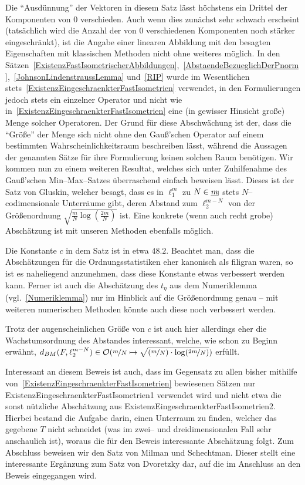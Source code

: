 \documentclass[a4paper]{report}
\numberwithin[\roman]{equation}{sat}
\begin{document}

\parag
Die \enquote{Ausdünnung} der Vektoren in diesem Satz lässt höchstens ein Drittel der
Komponenten von $0$ verschieden.
Auch wenn dies zunächst sehr schwach erscheint
(tatsächlich wird die Anzahl der von $0$ verschiedenen Komponenten noch stärker
eingeschränkt), ist die Angabe einer linearen Abbildung mit den besagten
Eigenschaften mit klassischen Methoden nicht ohne weiteres möglich.\parag
In den Sätzen~\ref{ExistenzFastIsometrischerAbbildungen},~\ref{AbstaendeBezueglichDerPnorm},~\ref{JohnsonLindenstraussLemma} und~\ref{RIP} wurde im Wesentlichen stets~\ref{ExistenzEingeschraenkterFastIsometrien} verwendet, in den Formulierungen
jedoch stets ein einzelner Operator und nicht wie in~\ref{ExistenzEingeschraenkterFastIsometrien} eine (in gewisser Hinsicht große)
Menge solcher Operatoren.
Der Grund für diese Abschwächung ist der, dass die \enquote{Größe} der Menge sich nicht ohne den Gauß'schen Operator auf
einem bestimmten Wahrscheinlichkeitsraum beschreiben lässt, während die
Aussagen der genannten Sätze für ihre Formulierung keinen solchen Raum
benötigen.\parag
Wir kommen nun zu einem weiteren Resultat, welches sich unter Zuhilfenahme des
Gauß'schen Min--Max--Satzes überraschend einfach beweisen lässt.
Dieses ist der Satz von Gluskin, welcher besagt, dass es in $\ell_1^m$ zu $N \in \haken m$
stets $N$--codimensionale Unterräume gibt, deren Abstand zum $\ell_2^{m-N}$ von
der Größenordnung $\sqrt{\frac m N \log\left(\frac{2m}N\right)}$ ist.
Eine konkrete (wenn auch recht grobe) Abschätzung ist mit unseren Methoden ebenfalls möglich.



Die Konstante $c$ in dem Satz ist in etwa $48.2$.
Beachtet man, dass die Abschätzungen für die Ordnungsstatistiken eher kanonisch als filigran waren,
so ist es naheliegend anzunehmen, dass diese Konstante etwas verbessert werden kann.
Ferner ist auch die Abschätzung des $t_\eta$ aus dem Numeriklemma (vgl.~\ref{Numeriklemma}) nur im Hinblick auf die Größenordnung genau -- mit weiteren
numerischen Methoden könnte auch diese noch verbessert werden.

Trotz der augenscheinlichen Größe von $c$ ist auch hier allerdings eher die
Wachstumsordnung des Abstandes interessant, welche, wie schon zu Beginn erwähnt, $d_{BM}(F, \ell_2^{m-N}) \in \mathcal{O}(\nicefrac m N \mapsto \sqrt{(\nicefrac m N) \cdot \log(\nicefrac {2m}N)})$ erfüllt.

Interessant an diesem Beweis ist auch, dass im Gegensatz zu allen bisher
mithilfe von~\ref{ExistenzEingeschraenkterFastIsometrien} bewiesenen Sätzen
nur~
{ExistenzEingeschraenkterFastIsometrien1} verwendet wird und nicht etwa die
sonst nützliche Abschätzung aus
{ExistenzEingeschraenkterFastIsometrien2}.
Hierbei bestand die Aufgabe darin,
einen Unterraum zu finden, welcher das gegebene $T$ nicht schneidet (was im
zwei-- und dreidimensionalen Fall sehr anschaulich ist), woraus die für den
Beweis interessante Abschätzung folgt.\parag
Zum Abschluss beweisen wir den Satz von Milman und Schechtman.
Dieser stellt eine interessante Ergänzung zum Satz von Dvoretzky dar, auf die im Anschluss
an den Beweis eingegangen wird.
\end{document}
